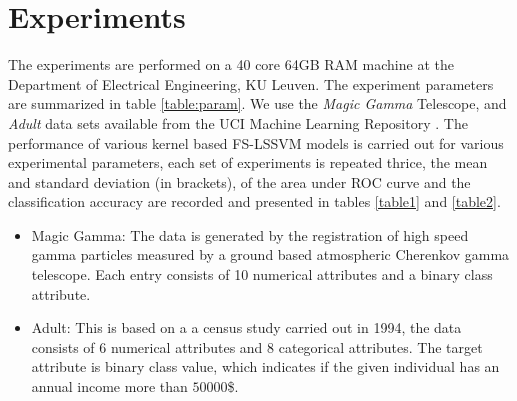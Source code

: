 \chapter{Experiments}
\label{cha:n}
The experiments are performed on a 40 core 64GB RAM machine at the Department of Electrical Engineering, KU Leuven. The experiment parameters are summarized in table \ref{table:param}. We use the \textit{Magic Gamma} Telescope, and \textit{Adult} data sets available from the UCI Machine Learning Repository \cite{Lichman:2013}. The performance of various kernel based FS-LSSVM models is carried out for various experimental parameters, each set of experiments is repeated thrice, the mean and standard deviation (in brackets), of the area under ROC curve and the classification accuracy are recorded and presented in tables \ref{table1} and \ref{table2}.

\begin{itemize}
\item Magic Gamma: The data is generated by the registration of high speed gamma particles measured by a ground based atmospheric Cherenkov gamma telescope. Each entry consists of 10 numerical attributes and a binary class attribute. 
\item Adult: This is based on a a census study carried out in 1994, the data consists of 6 numerical attributes and 8 categorical attributes. The target attribute is binary class value, which indicates if the given individual has an annual income more than $50 000$\$.
\end{itemize}

\begin{table*}[!htbp]
\caption{Experiment Parameters}
\label{table:param}
\centering
{}
\end{table*}

